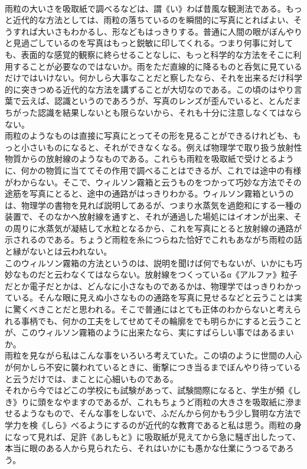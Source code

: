 \documentclass[8pt]{extreport}
\begin{document}
\begin{CJK}{UTF8}{min}
\\	雨粒の大いさを吸取紙で調べるなどは、謂《い》わば昔風な観測法である。もっと近代的な方法としては、雨粒の落ちているのを瞬間的に写真にとればよい、そうすれば大いさもわかるし、形などもはっきりする。普通に人間の眼がぼんやりと見過ごしているのを写真はもっと鋭敏に印してくれる。つまり何事に対しても、表面的な感覚的観察に終らせることなしに、もっと科学的な方法をそこに利用することが必要なのではないか。雨をただ直線的に降るものと呑気に見ているだけではいけない。何かしら大事なことだと察したなら、それを出来るだけ科学的に突きつめる近代的な方法を講ずることが大切なのである。この頃のはやり言葉で云えば、認識というのであろうが、写真のレンズが歪んでいると、とんだまちがった認識を結果しないとも限らないから、それも十分に注意しなくてはならない。
\\	雨粒のようなものは直接に写真にとってその形を見ることができるけれども、もっと小さいものになると、それができなくなる。例えば物理学で取り扱う放射性物質からの放射線のようなものである。これらも雨粒を吸取紙で受けとるように、何かの物質に当ててその作用で調べることはできるが、これでは途中の有様がわからない。そこで、ウィルソン霧箱と云うものをつかって巧妙な方法でその途筋を写真にとると、途中の通路がはっきりわかる。ウィルソン霧箱というのは、物理学の書物を見れば説明してあるが、つまり水蒸気を過飽和にする一種の装置で、そのなかへ放射線を通すと、それが通過した場処にはイオンが出来、その周りに水蒸気が凝結して水粒となるから、これを写真にとると放射線の通路が示されるのである。ちょうど雨粒を糸につらねた恰好でこれもあながち雨粒の話と縁がないとは云われない。
\\	このウィルソン霧箱の方法というのは、説明を聞けば何でもないが、いかにも巧妙なものだと云わなくてはならない。放射線をつくっているα《アルファ》粒子だとか電子だとかは、どんなに小さなものであるかは、物理学ではっきりわかっている。そんな眼に見えぬ小さなものの通路を写真に見せるなどと云うことは実に驚くべきことだと思われる。そこで普通にはとても正体のわからないと考えられる事柄でも、何かの工夫をしてせめてその輪廓をでも明らかにすると云うことが、このウィルソン霧箱のように出来たなら、実にすばらしい事ではあるまいか。
\\	雨粒を見ながら私はこんな事をいろいろ考えていた。この頃のように世間の人心が何かしら不安に襲われているときに、衝撃につき当るまでぼんやり待っていると云うだけでは、まことに心細いものである。
\\	それから今ではどこの学校にも試験があって、試験間際になると、学生が頻《しき》りに頭をなやますのであるが、これもちょうど雨粒の大きさを吸取紙に滲ませるようなもので、そんな事をしないで、ふだんから何かもう少し賢明な方法で学力を検《しら》べるようにするのが近代的な教育であると私は思う。雨粒の身になって見れば、足許《あしもと》に吸取紙が見えてから急に騒ぎ出したって、本当に眼のある人から見られたら、それはいかにも愚かな仕業にうつるであろう。

\end{CJK}
\end{document}
